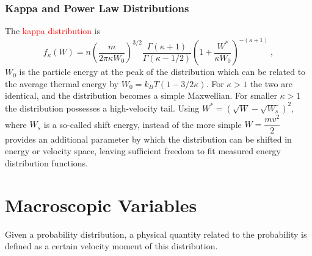 \documentclass[12pt,a4paper]{article}
\begin{document}
\subsubsection{Kappa and Power Law Distributions}
The \textcolor{red}{kappa distribution} is
\begin{equation}
f_\kappa (W) = n \left(\frac{m}{2\pi \kappa W_0} \right)^{3/2} \frac{\Gamma(\kappa+1)}{\Gamma(\kappa-1/2)} \left(1+ \frac{W^\ast}{\kappa W_0} \right)^{-(\kappa +1)} ~,
\end{equation}
$W_0$ is the particle energy at the peak of the distribution which can be related to the average thermal energy by $W_0 = k_B T(1 - 3 / 2\kappa)$. For $\kappa > 1$ the two are identical, and the distribution becomes a simple Maxwellian. For smaller $\kappa > 1$ the distribution possesses a high-velocity tail. Using $W^\ast = (\sqrt{W}- \sqrt{W_s})^2$, where $W_s$ is a so-called shift energy, instead of the more simple $W = \dfrac{mv^2}{2}$ provides an additional parameter by which the distribution can be shifted in energy or velocity space, leaving sufficient freedom to fit measured energy distribution functions.





\section{Macroscopic Variables}
\cite{1996bspp.book.....B}  Given a probability distribution, a physical quantity related to the probability is defined as a certain velocity moment of this distribution.
\end{document}
